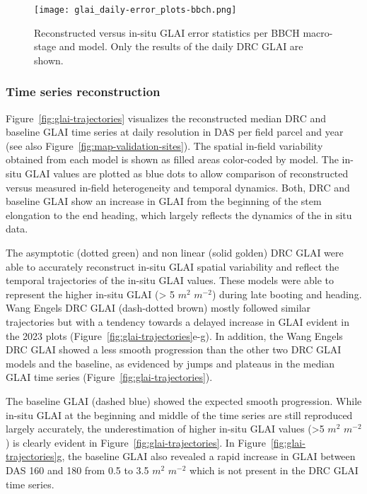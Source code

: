 \begin{figure}[H]
    \centering
    \texttt{[image: glai\_daily-error\_plots-bbch.png]}
    \caption{Reconstructed versus in-situ \gls{GLAI} error statistics per BBCH macro-stage and model. Only the results of the daily \gls{DRC} \gls{GLAI} are shown.}
    \label{fig:glai-errors-phenology}
\end{figure}

\subsubsection{Time series reconstruction}

Figure~\ref{fig:glai-trajectories} visualizes the reconstructed median \gls{DRC} and baseline \gls{GLAI} time series at daily resolution in \gls{DAS} per field parcel and year (see also Figure~\ref{fig:map-validation-sites}). The spatial in-field variability obtained from each model is shown as filled areas color-coded by model. The in-situ \gls{GLAI} values are plotted as blue dots to allow comparison of reconstructed versus measured in-field heterogeneity and temporal dynamics. Both, \gls{DRC} and baseline \gls{GLAI} show an increase in \gls{GLAI} from the beginning of the stem elongation to the end heading, which largely reflects the dynamics of the in situ data.

The asymptotic (dotted green) and non linear (solid golden) \gls{DRC} \gls{GLAI} were able to accurately reconstruct in-situ \gls{GLAI} spatial variability and reflect the temporal trajectories of the in-situ \gls{GLAI} values. These models were able to represent the higher in-situ \gls{GLAI} (> 5 $m^2$ $m^{-2}$) during late booting and heading. Wang Engels \gls{DRC} \gls{GLAI} (dash-dotted brown) mostly followed similar trajectories but with a tendency towards a delayed increase in \gls{GLAI} evident in the 2023 plots (Figure~\ref{fig:glai-trajectories}e-g). In addition, the Wang Engels \gls{DRC} \gls{GLAI} showed a less smooth progression than the other two \gls{DRC} \gls{GLAI} models and the baseline, as evidenced by jumps and plateaus in the median GLAI time series (Figure~\ref{fig:glai-trajectories}).

The baseline \gls{GLAI} (dashed blue) showed the expected smooth progression. While in-situ \gls{GLAI} at the beginning and middle of the time series are still reproduced largely accurately, the underestimation of higher in-situ \gls{GLAI} values (>5 $m^2$ $m^{-2}$) is clearly evident in Figure~\ref{fig:glai-trajectories}. In Figure~\ref{fig:glai-trajectories}g, the baseline \gls{GLAI} also revealed a rapid increase in GLAI between \gls{DAS} 160 and 180 from 0.5 to 3.5 $m^2$ $m^{-2}$ which is not present in the \gls{DRC} \gls{GLAI} time series.

